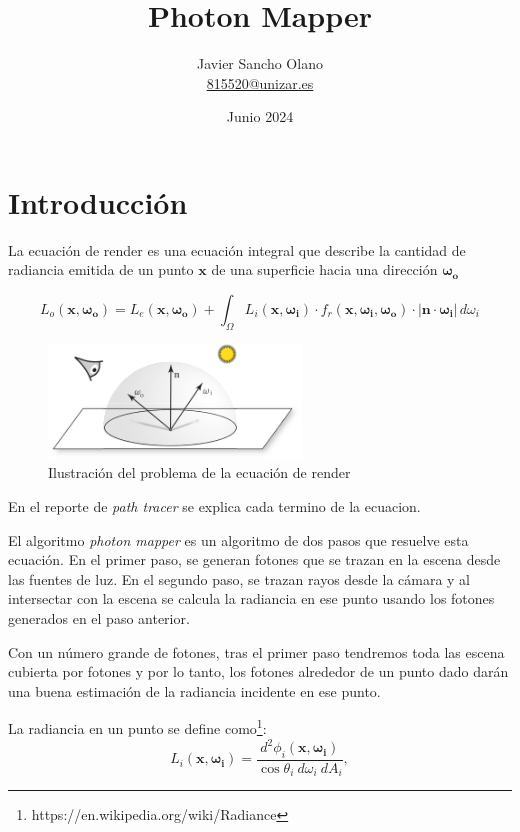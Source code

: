 \documentclass{article}
\title{Photon Mapper}
\author{Javier Sancho Olano \\ \href{mailto:815520@unizar.es}{815520@unizar.es}}
\date{Junio 2024}
\begin{document}
\maketitle

\tableofcontents
\newpage

\section{Introducción}
La ecuación de render es una ecuación integral que describe la cantidad de
radiancia emitida de un punto \(\mathbf{x}\) de una superficie hacia una
dirección \(\mathbf{\omega_{o}}\)

\begin{equation}
L_o(\mathbf{x}, \mathbf{\omega_{o}}) = L_e(\mathbf{x}, \mathbf{\omega_{o}}) + \int_{\Omega} L_i(\mathbf{x}, \mathbf{\omega_{i}}) \cdot f_r(\mathbf{x}, \mathbf{\omega_{i}}, \mathbf{\omega_{o}}) \cdot  |\mathbf{n} \cdot \mathbf{\omega_{i}}| \, d\omega_{i}
\end{equation}

\begin{figure}[h]
    \centering
    \includegraphics[width=0.6\textwidth]{imgs/rendereq.png}
    \caption{Ilustración del problema de la ecuación de render}
\end{figure}

En el reporte de \textit{path tracer} se explica cada termino de la ecuacion.

El algoritmo \textit{photon mapper} es un algoritmo de dos pasos que resuelve
esta ecuación. En el primer paso, se generan fotones que se trazan en la escena
desde las fuentes de luz. En el segundo paso, se trazan rayos desde la cámara y
al intersectar con la escena se calcula la radiancia en ese punto usando los
fotones generados en el paso anterior.

Con un número grande de fotones, tras el primer paso tendremos toda las escena
cubierta por fotones y por lo tanto, los fotones alrededor de un punto dado
darán una buena estimación de la radiancia incidente en ese punto.

La radiancia en un punto se define como\footnote{https://en.wikipedia.org/wiki/Radiance}:
\begin{equation} 
  L_i(\mathbf{x}, \mathbf{\omega_{i}}) = \frac{d^{2}\phi_{i}(\mathbf{x}, \mathbf{\omega_{i}})}{\cos\theta_{i} \: d\omega_{i} \: dA_{i}},
\end{equation}
\end{document}
